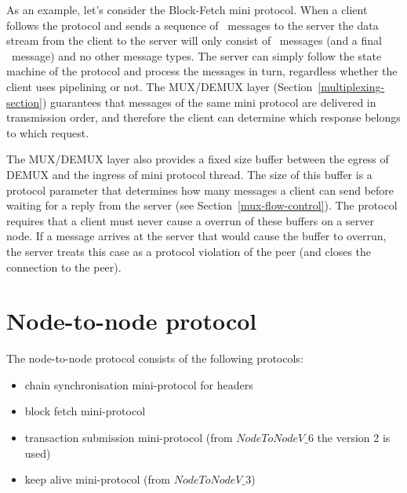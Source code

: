 As an example, let's consider the Block-Fetch mini protocol.
When a client follows the protocol and sends a sequence of \RequestRange~messages to the server
the data stream from the client to the server will only consist of \RequestRange~messages
(and a final \ClientDone~message) and no other message types.
The server can simply follow the state machine of the protocol and process the messages in turn,
regardless whether the client uses pipelining or not.
The MUX/DEMUX layer (Section~\ref{multiplexing-section}) guarantees
that messages of the same mini protocol are delivered in transmission order,
and therefore the client can determine which response belongs to which request.

The MUX/DEMUX layer also provides a fixed size buffer between the egress of DEMUX and the ingress
of mini protocol thread.
The size of this buffer is a protocol parameter that determines how many messages
a client can send before waiting for a reply from the server (see Section~\ref{mux-flow-control}).
The protocol requires that a client must never cause a overrun of these buffers on a server node.
If a message arrives at the server that would cause the buffer to overrun,
the server treats this case as a protocol violation of the peer
(and closes the connection to the peer).

\section{Node-to-node protocol}
\newline
{}\newline

The node-to-node protocol consists of the following protocols:

\begin{itemize}
  \item chain synchronisation mini-protocol for headers
  \item block fetch mini-protocol
  \item transaction submission mini-protocol (from $NodeToNodeV\_6$ the version
        2 is used)
  \item keep alive mini-protocol (from $NodeToNodeV\_3$)
\end{itemize}


